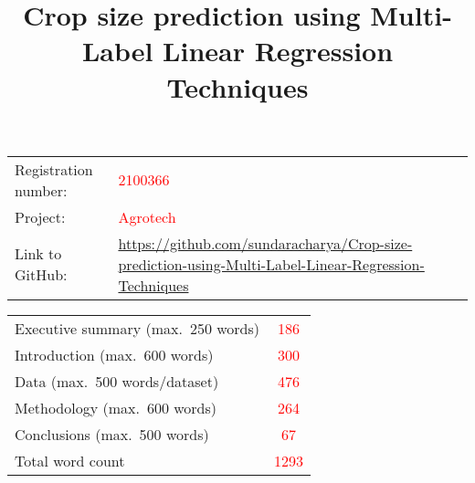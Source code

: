 \documentclass{article}
\title{Crop size prediction using Multi-Label Linear Regression Techniques}
\begin{document}
\maketitle

\begin{table}[h]
    \centering
    \begin{tabular}{ll}
        Registration number: & \textcolor{red}{2100366}\\
        Project: & \textcolor{red}{Agrotech}\\
        Link to GitHub: & \url{https://github.com/sundaracharya/Crop-size-prediction-using-Multi-Label-Linear-Regression-Techniques}\\
    \end{tabular}
\end{table}



\begin{table}[h]
    \centering
    \begin{tabular}{lc}
        Executive summary (max.\ 250 words) & \textcolor{red}{186}\\
        Introduction (max.\ 600 words) & \textcolor{red}{300}\\
        Data (max.\ 500 words/dataset) & \textcolor{red}{476}\\
        Methodology (max.\ 600 words) & \textcolor{red}{264}\\
        Conclusions (max.\ 500 words) & \textcolor{red}{67}\\
        \hline
        Total word count & \textcolor{red}{1293}\\
    \end{tabular}
\end{table}

\tableofcontents

\clearpage
\end{document}
